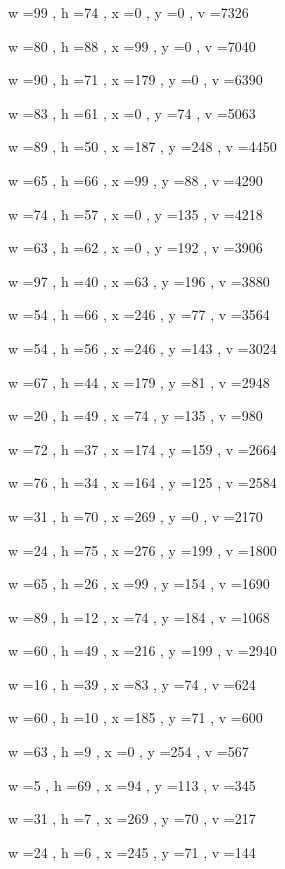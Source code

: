 \documentclass[11pt]{article}
\begin{document}
w =99 , h =74 , x =0 , y =0 , v =7326
\par
w =80 , h =88 , x =99 , y =0 , v =7040
\par
w =90 , h =71 , x =179 , y =0 , v =6390
\par
w =83 , h =61 , x =0 , y =74 , v =5063
\par
w =89 , h =50 , x =187 , y =248 , v =4450
\par
w =65 , h =66 , x =99 , y =88 , v =4290
\par
w =74 , h =57 , x =0 , y =135 , v =4218
\par
w =63 , h =62 , x =0 , y =192 , v =3906
\par
w =97 , h =40 , x =63 , y =196 , v =3880
\par
w =54 , h =66 , x =246 , y =77 , v =3564
\par
w =54 , h =56 , x =246 , y =143 , v =3024
\par
w =67 , h =44 , x =179 , y =81 , v =2948
\par
w =20 , h =49 , x =74 , y =135 , v =980
\par
w =72 , h =37 , x =174 , y =159 , v =2664
\par
w =76 , h =34 , x =164 , y =125 , v =2584
\par
w =31 , h =70 , x =269 , y =0 , v =2170
\par
w =24 , h =75 , x =276 , y =199 , v =1800
\par
w =65 , h =26 , x =99 , y =154 , v =1690
\par
w =89 , h =12 , x =74 , y =184 , v =1068
\par
w =60 , h =49 , x =216 , y =199 , v =2940
\par
w =16 , h =39 , x =83 , y =74 , v =624
\par
w =60 , h =10 , x =185 , y =71 , v =600
\par
w =63 , h =9 , x =0 , y =254 , v =567
\par
w =5 , h =69 , x =94 , y =113 , v =345
\par
w =31 , h =7 , x =269 , y =70 , v =217
\par
w =24 , h =6 , x =245 , y =71 , v =144
\par
\newpage
\end{document}
